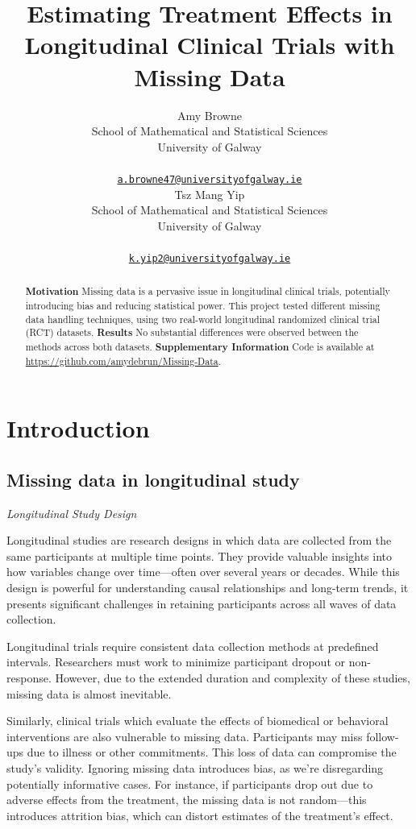 \documentclass{article}
\title{Estimating Treatment Effects in Longitudinal Clinical Trials with
Missing Data}
\author{
    Amy Browne
   \\
    School of Mathematical and Statistical Sciences \\
    University of Galway \\
   \\
  \texttt{\href{mailto:a.browne47@universityofgalway.ie}{\nolinkurl{a.browne47@universityofgalway.ie}}} \\
   \And
    Tsz Mang Yip
   \\
    School of Mathematical and Statistical Sciences \\
    University of Galway \\
   \\
  \texttt{\href{mailto:k.yip2@universityofgalway.ie}{\nolinkurl{k.yip2@universityofgalway.ie}}} \\
  }
\begin{document}
\maketitle


\begin{abstract}
\textbf{Motivation} Missing data is a pervasive issue in longitudinal
clinical trials, potentially introducing bias and reducing statistical
power. This project tested different missing data handling techniques,
using two real-world longitudinal randomized clinical trial (RCT)
datasets. \textbf{Results} No substantial differences were observed
between the methods across both datasets.
\textbf{Supplementary Information} Code is available at
\url{https://github.com/amydebrun/Missing-Data}.
\end{abstract}


\section{Introduction}\label{introduction}

\subsection{Missing data in longitudinal
study}\label{missing-data-in-longitudinal-study}

\emph{Longitudinal Study Design}

Longitudinal studies are research designs in which data are collected
from the same participants at multiple time points. They provide
valuable insights into how variables change over time---often over
several years or decades. While this design is powerful for
understanding causal relationships and long-term trends, it presents
significant challenges in retaining participants across all waves of
data collection.

Longitudinal trials require consistent data collection methods at
predefined intervals. Researchers must work to minimize participant
dropout or non-response. However, due to the extended duration and
complexity of these studies, missing data is almost inevitable.

Similarly, clinical trials which evaluate the effects of biomedical or
behavioral interventions are also vulnerable to missing data.
Participants may miss follow-ups due to illness or other commitments.
This loss of data can compromise the study's validity. Ignoring missing
data introduces bias, as we're disregarding potentially informative
cases. For instance, if participants drop out due to adverse effects
from the treatment, the missing data is not random---this introduces
attrition bias, which can distort estimates of the treatment's effect.
\end{document}
